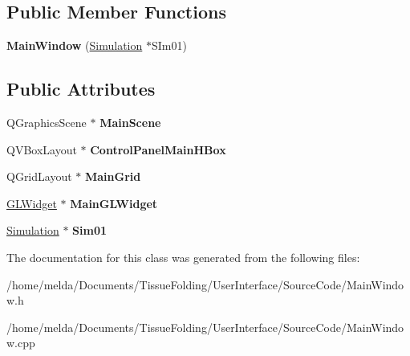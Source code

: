 \subsection*{Public Member Functions}
\begin{DoxyCompactItemize}
\item 
\hypertarget{classMainWindow_aa1c3a3a33e1e67e055b8448ad9a9e208}{}{\bfseries Main\+Window} (\hyperlink{classSimulation}{Simulation} $\ast$S\+Im01)\label{classMainWindow_aa1c3a3a33e1e67e055b8448ad9a9e208}

\end{DoxyCompactItemize}
\subsection*{Public Attributes}
\begin{DoxyCompactItemize}
\item 
\hypertarget{classMainWindow_a9604326eab0369c7de6be01f992e0ba7}{}Q\+Graphics\+Scene $\ast$ {\bfseries Main\+Scene}\label{classMainWindow_a9604326eab0369c7de6be01f992e0ba7}

\item 
\hypertarget{classMainWindow_a80b2787fc058a3f5141b905d6c69c0ad}{}Q\+V\+Box\+Layout $\ast$ {\bfseries Control\+Panel\+Main\+H\+Box}\label{classMainWindow_a80b2787fc058a3f5141b905d6c69c0ad}

\item 
\hypertarget{classMainWindow_a028cf99e2842ca1250d4c103310c3430}{}Q\+Grid\+Layout $\ast$ {\bfseries Main\+Grid}\label{classMainWindow_a028cf99e2842ca1250d4c103310c3430}

\item 
\hypertarget{classMainWindow_aebd88a36f5ea16df9a037f7591090856}{}\hyperlink{classGLWidget}{G\+L\+Widget} $\ast$ {\bfseries Main\+G\+L\+Widget}\label{classMainWindow_aebd88a36f5ea16df9a037f7591090856}

\item 
\hypertarget{classMainWindow_aedd252a3fb1c0e6c7fe2d9edb5d19b83}{}\hyperlink{classSimulation}{Simulation} $\ast$ {\bfseries Sim01}\label{classMainWindow_aedd252a3fb1c0e6c7fe2d9edb5d19b83}

\end{DoxyCompactItemize}


The documentation for this class was generated from the following files\+:\begin{DoxyCompactItemize}
\item 
/home/melda/\+Documents/\+Tissue\+Folding/\+User\+Interface/\+Source\+Code/Main\+Window.\+h\item 
/home/melda/\+Documents/\+Tissue\+Folding/\+User\+Interface/\+Source\+Code/Main\+Window.\+cpp\end{DoxyCompactItemize}
